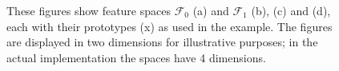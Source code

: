 \begin{figure}
\centering
{}
\caption{These figures show feature spaces ${\mathcal F}_0$ (a) and ${\mathcal F}_1$ (b), (c) and (d), each with their prototypes (x) as used in the example. The figures are displayed in two dimensions for illustrative purposes; in the actual implementation the spaces have 4 dimensions.}
\label{f:lg:proto}
\end{figure}


